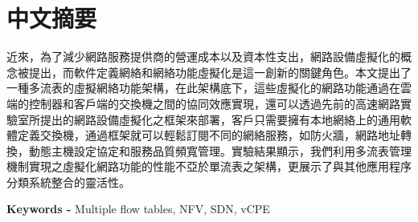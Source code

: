 \chapter*{中文摘要}
近來，為了減少網路服務提供商的營運成本以及資本性支出，網路設備虛擬化的概念被提出，而軟件定義網絡和網絡功能虛擬化是這一創新的關鍵角色。本文提出了一種多流表的虛擬網絡功能架構，在此架構底下，這些虛擬化的網路功能通過在雲端的控制器和客戶端的交換機之間的協同效應實現，還可以透過先前的高速網路實驗室所提出的網路設備虛擬化之框架來部署，客戶只需要擁有本地網絡上的通用軟體定義交換機，通過框架就可以輕鬆訂閱不同的網絡服務，如防火牆，網路地址轉換，動態主機設定協定和服務品質頻寬管理。實驗結果顯示，我們利用多流表管理機制實現之虛擬化網路功能的性能不亞於單流表之架構，更展示了與其他應用程序分類系統整合的靈活性。

\noindent \textbf{Keywords - }{Multiple flow tables, NFV, SDN, vCPE }
